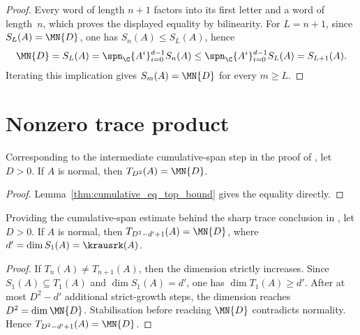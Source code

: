 \begin{proof}\leanok{}
    Every word of length $n+1$ factors into its first letter and a word
    of length~$n$, which proves the displayed equality by bilinearity.
    For $L=n+1$, since $S_L(A)=\MN{D}$, one has
    $S_n(A)\le S_L(A)$, hence
    \begin{align}
        \MN{D}
        =S_L(A)
        =\spn_{\C}\{A^i\}_{i=0}^{d-1}S_n(A)
        \le\spn_{\C}\{A^i\}_{i=0}^{d-1}S_L(A)
        =S_{L+1}(A).
        \notag
    \end{align}
    Iterating this implication gives $S_m(A)=\MN{D}$ for every $m\ge L$.
\end{proof}

\section{Nonzero trace product}

\begin{lemma}\label{thm:cumulative_eq_top}
    \label{thm:wielandt_bound}
    \leanok
    Corresponding to the intermediate cumulative-span step in the proof of
    \cite[Lemma~1]{Sanz2010Quantum}, let $D>0$. If $A$ is normal, then
    $T_{D^2}(A)=\MN{D}$.
\end{lemma}

\begin{proof}\leanok{}
    Lemma~\ref{thm:cumulative_eq_top_bound} gives the equality directly.
\end{proof}

\begin{lemma}%
    \label{thm:cumulative_span_sharp}
    \leanok
    Providing the cumulative-span estimate behind the sharp trace conclusion in
    \cite[Lemma~1]{Sanz2010Quantum}, let $D>0$. If $A$ is normal, then
    $T_{D^2-d'+1}(A)=\MN{D}$, where
    $d'=\dim S_1(A)=\krausrk(A)$.
\end{lemma}

\begin{proof}
    \leanok
    If $T_n(A)\neq T_{n+1}(A)$, then the dimension strictly increases.
    Since $S_1(A)\subseteq T_1(A)$ and $\dim S_1(A)=d'$, one has
    $\dim T_1(A)\ge d'$.
    After at most $D^2-d'$ additional strict-growth steps, the dimension
    reaches $D^2=\dim\MN{D}$.
    Stabilisation before reaching $\MN{D}$ contradicts normality.
    Hence $T_{D^2-d'+1}(A)=\MN{D}$.
\end{proof}


